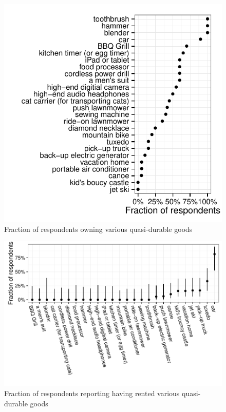 \documentclass[11pt]{article}
\begin{document}
\begin{figure}
\centering 
\label{fig:ownership} 
\caption{Fraction of respondents owning various quasi-durable goods}
\begin{minipage}{0.90 \linewidth}
\includegraphics[width = \linewidth]{./plots/ownership_fractions.pdf} 
\end{minipage} 
\end{figure} 

\begin{figure}
\centering 
\label{fig:renting} 
\caption{Fraction of respondents reporting having rented various quasi-durable goods}
\begin{minipage}{0.90 \linewidth}
\includegraphics[width = \linewidth]{./plots/rental_fractions.pdf} 
\end{minipage} 
\end{figure} 
\end{document}
